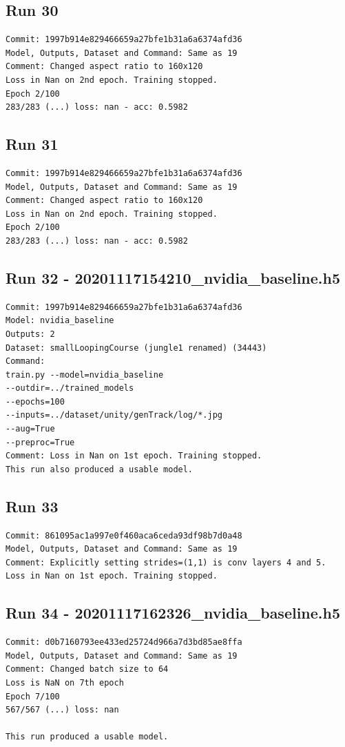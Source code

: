 \subsection{Run 30}
\begin{verbatim}
Commit: 1997b914e829466659a27bfe1b31a6a6374afd36  
Model, Outputs, Dataset and Command: Same as 19
Comment: Changed aspect ratio to 160x120
Loss in Nan on 2nd epoch. Training stopped.
Epoch 2/100
283/283 (...) loss: nan - acc: 0.5982
\end{verbatim}

\subsection{Run 31}
\label{app_res:31}
\begin{verbatim}
Commit: 1997b914e829466659a27bfe1b31a6a6374afd36  
Model, Outputs, Dataset and Command: Same as 19
Comment: Changed aspect ratio to 160x120
Loss in Nan on 2nd epoch. Training stopped.
Epoch 2/100
283/283 (...) loss: nan - acc: 0.5982
\end{verbatim}

\subsection{Run 32 - 20201117154210\_nvidia\_baseline.h5}
\begin{verbatim}
Commit: 1997b914e829466659a27bfe1b31a6a6374afd36  
Model: nvidia_baseline
Outputs: 2
Dataset: smallLoopingCourse (jungle1 renamed) (34443)
Command: 
train.py --model=nvidia_baseline
--outdir=../trained_models
--epochs=100
--inputs=../dataset/unity/genTrack/log/*.jpg
--aug=True
--preproc=True
Comment: Loss in Nan on 1st epoch. Training stopped.
This run also produced a usable model.
\end{verbatim}

\subsection{Run 33}
\begin{verbatim}
Commit: 861095ac1a997e0f460aca6ceda93df98b7d0a48  
Model, Outputs, Dataset and Command: Same as 19
Comment: Explicitly setting strides=(1,1) is conv layers 4 and 5.
Loss in Nan on 1st epoch. Training stopped.
\end{verbatim}

\subsection{Run 34 - 20201117162326\_nvidia\_baseline.h5}
\begin{verbatim}
Commit: d0b7160793ee433ed25724d966a7d3bd85ae8ffa  
Model, Outputs, Dataset and Command: Same as 19
Comment: Changed batch size to 64
Loss is NaN on 7th epoch
Epoch 7/100
567/567 (...) loss: nan

This run produced a usable model.
\end{verbatim}

